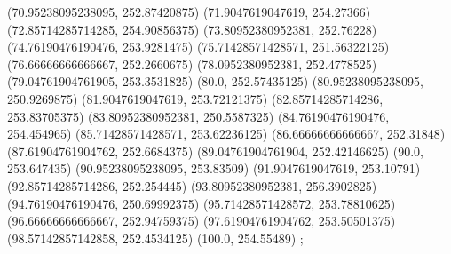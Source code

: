 {{{		(70.95238095238095, 252.87420875)
		(71.9047619047619, 254.27366)
		(72.85714285714285, 254.90856375)
		(73.80952380952381, 252.76228)
		(74.76190476190476, 253.9281475)
		(75.71428571428571, 251.56322125)
		(76.66666666666667, 252.2660675)
		(78.0952380952381, 252.4778525)
		(79.04761904761905, 253.3531825)
		(80.0, 252.57435125)
		(80.95238095238095, 250.9269875)
		(81.9047619047619, 253.72121375)
		(82.85714285714286, 253.83705375)
		(83.80952380952381, 250.5587325)
		(84.76190476190476, 254.454965)
		(85.71428571428571, 253.62236125)
		(86.66666666666667, 252.31848)
		(87.61904761904762, 252.6684375)
		(89.04761904761904, 252.42146625)
		(90.0, 253.647435)
		(90.95238095238095, 253.83509)
		(91.9047619047619, 253.10791)
		(92.85714285714286, 252.254445)
		(93.80952380952381, 256.3902825)
		(94.76190476190476, 250.69992375)
		(95.71428571428572, 253.78810625)
		(96.66666666666667, 252.94759375)
		(97.61904761904762, 253.50501375)
		(98.57142857142858, 252.4534125)
		(100.0, 254.55489)
	};

}}
